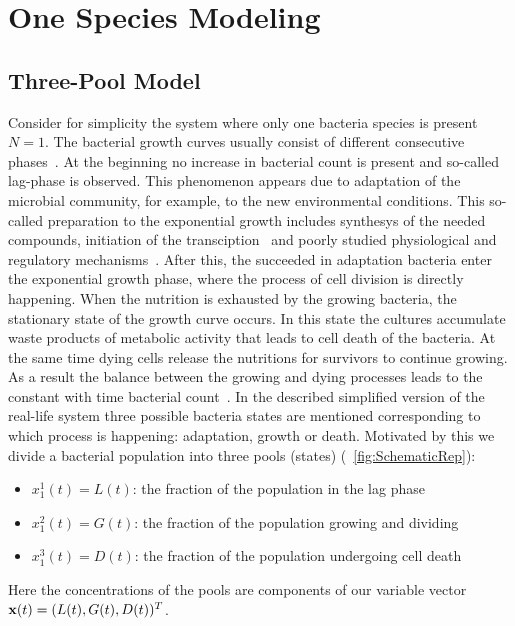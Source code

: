 \documentclass[10pt,A4paper]{article}
\begin{document}
\section{One Species Modeling}
\subsection{Three-Pool Model}
Consider for simplicity the system where only one bacteria species is present $N=1$.
The bacterial growth curves usually consist of different consecutive phases~\cite{buchanan_when_1997}.
At the beginning no increase in bacterial count is present and so-called lag-phase is observed.
This phenomenon appears due to adaptation of the microbial community, for example, to the new environmental conditions.
This so-called preparation to the exponential growth includes synthesys of the needed compounds, initiation of the transciption~\cite{rolfe_lag_2012} and poorly studied physiological and regulatory mechanisms~\cite{monod_growth_1949}.
After this, the succeeded in adaptation bacteria enter the exponential growth phase, where the process of cell division is directly happening.
When the nutrition is exhausted by the growing bacteria, the stationary state of the growth curve occurs.
In this state the cultures accumulate waste products of metabolic activity that leads to cell death of the bacteria.
At the same time dying cells release the nutritions for survivors to continue growing.
As a result the balance between the growing and dying processes leads to the constant with time bacterial count~\cite{navarro_llorens_stationary_2010}.
In the described simplified version of the real-life system three possible bacteria states are mentioned corresponding to which process is happening: adaptation, growth or death.
Motivated by this we divide a bacterial population into three pools (states) (~\ref{fig:SchematicRep}):
\begin{itemize}
\item $x^1_1 (t) = L(t)$: the fraction of the population in the lag phase
\item $x^2_1 (t) = G(t)$: the fraction of the population growing and dividing
\item $x^3_1 (t) = D(t)$: the fraction of the population undergoing cell death
\end{itemize}
Here the concentrations of the pools are components of our variable vector $\mathbf{x} (t) = (L(t), G(t), D(t))^T$.
\end{document}
